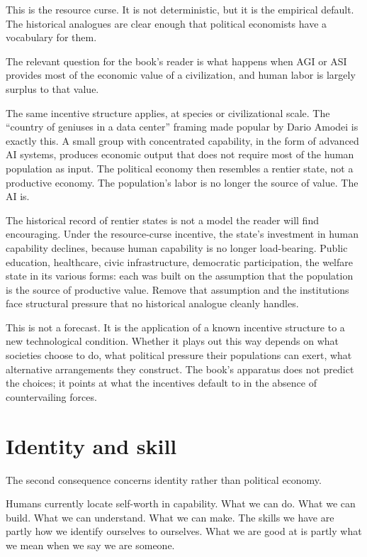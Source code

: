 This is the resource curse. It is not deterministic, but it is the empirical default. The historical analogues are clear enough that political economists have a vocabulary for them.

The relevant question for the book's reader is what happens when AGI or ASI provides most of the economic value of a civilization, and human labor is largely surplus to that value.

The same incentive structure applies, at species or civilizational scale. The ``country of geniuses in a data center'' framing made popular by Dario Amodei is exactly this. A small group with concentrated capability, in the form of advanced AI systems, produces economic output that does not require most of the human population as input. The political economy then resembles a rentier state, not a productive economy. The population's labor is no longer the source of value. The AI is.

The historical record of rentier states is not a model the reader will find encouraging. Under the resource-curse incentive, the state's investment in human capability declines, because human capability is no longer load-bearing. Public education, healthcare, civic infrastructure, democratic participation, the welfare state in its various forms: each was built on the assumption that the population is the source of productive value. Remove that assumption and the institutions face structural pressure that no historical analogue cleanly handles.

This is not a forecast. It is the application of a known incentive structure to a new technological condition. Whether it plays out this way depends on what societies choose to do, what political pressure their populations can exert, what alternative arrangements they construct. The book's apparatus does not predict the choices; it points at what the incentives default to in the absence of countervailing forces.

\section*{Identity and skill}

The second consequence concerns identity rather than political economy.

Humans currently locate self-worth in capability. What we can do. What we can build. What we can understand. What we can make. The skills we have are partly how we identify ourselves to ourselves. What we are good at is partly what we mean when we say we are someone.

